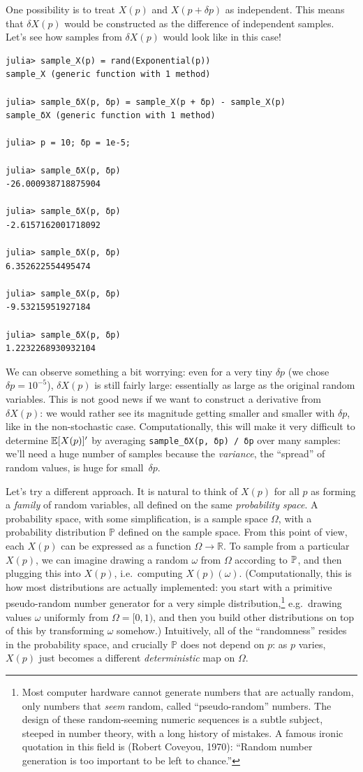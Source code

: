 One possibility is to treat $X(p)$ and $X(p + \delta p)$ as independent. 
This means that $\delta X(p)$ would be constructed as the difference of independent samples.
Let's see how samples from $\delta X(p)$ would look like in this case! 
\begin{verbatim}
julia> sample_X(p) = rand(Exponential(p))
sample_X (generic function with 1 method)

julia> sample_δX(p, δp) = sample_X(p + δp) - sample_X(p)
sample_δX (generic function with 1 method)

julia> p = 10; δp = 1e-5;

julia> sample_δX(p, δp)
-26.000938718875904

julia> sample_δX(p, δp)
-2.6157162001718092

julia> sample_δX(p, δp)
6.352622554495474

julia> sample_δX(p, δp)
-9.53215951927184

julia> sample_δX(p, δp)
1.2232268930932104
\end{verbatim}
We can observe something a bit worrying: even for a very tiny $\delta p$ (we chose $\delta p = 10^{-5}$),
$\delta X(p)$ is still fairly large: essentially as large as the original random variables.
This is not good news if we want to construct a derivative from $\delta X(p)$: we would rather see its magnitude 
getting smaller and smaller with $\delta p$, like in the non-stochastic case.  Computationally, this will make it very difficult to determine $\mathbb E[X(p)]'$ by averaging \texttt{sample\_δX(p, δp) / δp} over many samples: we'll need a huge number of samples because the \emph{variance}, the ``spread'' of random values, is huge for small~$\delta p$.

Let's try a different approach. It is natural to think of $X(p)$ for all $p$ as forming a \emph{family} of random variables, all 
defined on the same \emph{probability space}.
A probability space, with some simplification, is a sample space $\Omega$, with a probability distribution $\mathbb{P}$ defined 
on the sample space.
From this point of view, each $X(p)$ can be expressed as a function $\Omega \to \mathbb{R}$. 
To sample from a particular $X(p)$, we can imagine drawing a random $\omega$ from $\Omega$ according to $\mathbb P$, and then
plugging this into $X(p)$, i.e.~computing $X(p)(\omega)$.  (Computationally, this is how most distributions are actually implemented: you start with a primitive pseudo-random number generator for a very simple distribution,\footnote{Most computer hardware cannot generate numbers that are actually random, only numbers that \emph{seem} random, called ``pseudo-random'' numbers.  The design of these random-seeming numeric sequences is a subtle subject, steeped in number theory, with a long history of mistakes.  A famous ironic quotation in this field is (Robert Coveyou, 1970): ``Random number generation is too important to be left to chance.''} e.g.~drawing values $\omega$ uniformly from $\Omega = [0,1)$, and then you build other distributions on top of this by transforming $\omega$ somehow.) Intuitively, all of the ``randomness'' resides in the probability space, and crucially 
$\mathbb{P}$ does not depend on $p$: as $p$ varies, $X(p)$ just becomes a different 
\emph{deterministic} map on $\Omega$. 



